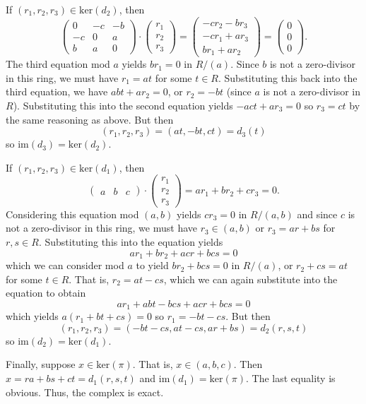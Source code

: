\documentclass[../../master.tex]{subfiles}
\begin{document}
\begin{solution}
    If $(r_1, r_2, r_3) \in \text{ker}(d_2)$, then
    \[
    \begin{pmatrix}
        0 & -c & -b \\
        -c & 0 & a \\
        b & a & 0
    \end{pmatrix} \cdot
    \begin{pmatrix}
        r_1 \\
        r_2 \\
        r_3
    \end{pmatrix} =
    \begin{pmatrix}
        -cr_2 - br_3 \\
        -cr_1 + ar_3 \\
        br_1 + ar_2
    \end{pmatrix} =
    \begin{pmatrix}
        0 \\
        0 \\
        0
    \end{pmatrix}.
    \]
    The third equation mod $a$ yields $br_1 = 0$ in $R / (a)$.
    Since $b$ is not a zero-divisor in this ring, we must have $r_1 = at$ for some $t \in R$.
    Substituting this back into the third equation, we have $abt + ar_2 = 0$, or $r_2 = -bt$ (since $a$ is not a zero-divisor in $R$).
    Substituting this into the second equation yields $-act + ar_3 = 0$ so $r_3 = ct$ by the same reasoning as above.
    But then
    \[
        (r_1, r_2, r_3) = (at, -bt, ct) = d_3(t)
    \]
    so $\text{im}(d_3) = \text{ker}(d_2)$.

    If $(r_1, r_2, r_3) \in \text{ker}(d_1)$, then
    \[
    \begin{pmatrix}
        a & b & c
    \end{pmatrix} \cdot
    \begin{pmatrix}
        r_1 \\
        r_2 \\
        r_3
    \end{pmatrix} =
    ar_1 + br_2 + cr_3 = 0.
    \]
    Considering this equation mod $(a, b)$ yields $cr_3 = 0$ in $R / (a, b)$ and since $c$ is not a zero-divisor in this ring, we must have $r_3 \in (a, b)$ or $r_3 = ar + bs$ for $r, s \in R$.
    Substituting this into the equation yields
    \[
    ar_1 + br_2 + acr + bcs = 0
    \]
    which we can consider mod $a$ to yield $br_2 + bcs = 0$ in $R / (a)$, or $r_2 + cs = at$ for some $t \in R$.
    That is, $r_2 = at - cs$, which we can again substitute into the equation to obtain
    \[
    ar_1 + abt - bcs + acr + bcs = 0
    \]
    which yields $a(r_1 + bt + cs) = 0$ so $r_1 = -bt - cs$.
    But then
    \[
        (r_1, r_2, r_3) = (-bt -cs, at - cs, ar + bs) = d_2(r, s, t)
    \]
    so $\text{im}(d_2) = \text{ker}(d_1)$.

    Finally, suppose $x \in \text{ker}(\pi)$.
    That is, $x \in (a, b, c)$.
    Then $x = ra + bs + ct = d_1(r, s, t)$ and $\text{im}(d_1) = \text{ker}(\pi)$.
    The last equality is obvious.
    Thus, the complex is exact.
\end{solution}
\end{document}
